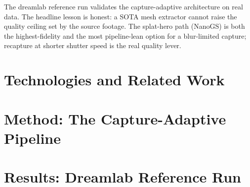\documentclass[a4paper,11pt]{report}
\begin{document}
\begin{keyfinding}
The dreamlab reference run validates the capture-adaptive architecture on real data.
The headline lesson is honest: a SOTA mesh extractor cannot raise the quality ceiling
set by the source footage.  The splat-hero path (NanoGS) is both the highest-fidelity
and the most pipeline-lean option for a blur-limited capture; recapture at shorter
shutter speed is the real quality lever.
\end{keyfinding}

\chapter{Technologies and Related Work}
\label{chap:tech}



\chapter{Method: The Capture-Adaptive Pipeline}
\label{chap:method}



\chapter{Results: Dreamlab Reference Run}
\label{chap:results}






\appendix




\end{document}
